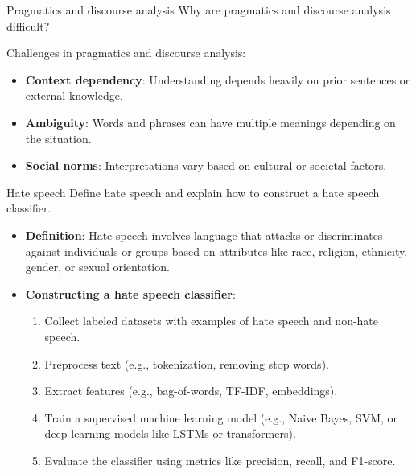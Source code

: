 \documentclass{article}
\begin{document}
\begin{exercise}{Pragmatics and discourse analysis}
  Why are pragmatics and discourse analysis difficult?

  \begin{solution}
    Challenges in pragmatics and discourse analysis:
    \begin{itemize}
        \item \textbf{Context dependency}: Understanding depends heavily on prior sentences or external knowledge.
        \item \textbf{Ambiguity}: Words and phrases can have multiple meanings depending on the situation.
        \item \textbf{Social norms}: Interpretations vary based on cultural or societal factors.
    \end{itemize}
  \end{solution}
\end{exercise}

\begin{exercise}{Hate speech}
  Define hate speech and explain how to construct a hate speech classifier.

  \begin{solution}
    \begin{itemize}
        \item \textbf{Definition}: Hate speech involves language that attacks or discriminates against individuals or groups based on attributes like race, religion, ethnicity, gender, or sexual orientation.
        \item \textbf{Constructing a hate speech classifier}:
        \begin{enumerate}
            \item Collect labeled datasets with examples of hate speech and non-hate speech.
            \item Preprocess text (e.g., tokenization, removing stop words).
            \item Extract features (e.g., bag-of-words, TF-IDF, embeddings).
            \item Train a supervised machine learning model (e.g., Naive Bayes, SVM, or deep learning models like LSTMs or transformers).
            \item Evaluate the classifier using metrics like precision, recall, and F1-score.
        \end{enumerate}
    \end{itemize}
  \end{solution}
\end{exercise}
\end{document}
